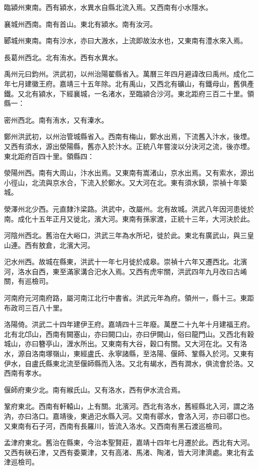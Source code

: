 臨潁州東南。西有潁水，水異水自縣北流入焉。又西南有小水隱水。

襄城州西南。南有首山。東北有潁水。南有汝河。

郾城州東南。南有沙水，亦曰大溵水，上流即故汝水也，又東南有澧水來入焉。

長葛州西北。北有洧水。西有水異水。

禹州元曰鈞州。洪武初，以州治陽翟縣省入。萬曆三年四月避諱改曰禹州。成化二年七月建徽王府。嘉靖三十五年除。北有禹山，又西北有礦山，有鐵母山，舊俱產鐵。又北有潁水，下經襄城，一名渚水，至臨潁合沙河。東北距府三百二十里。領縣一：

密州西北。南有洧水，又有溱水。

鄭州洪武初，以州治管城縣省入。西南有梅山，鄭水出焉，下流舊入汴水，後堙。又西有須水，源出滎陽縣，舊亦入於汴水。正統八年嘗浚以分決河之流，後亦堙。東北距府百四十里。領縣四：

滎陽州西。南有大周山，汴水出焉。又東南有嵩渚山，京水出焉。又有索水，源出小徑山，北流與京水合，下流入於鄭水。又大河在北。東有須水鎮，崇禎十年築城。

滎澤州北少西。元直隸汴梁路。洪武中，改屬州。北有故城。洪武八年因河患徙於南。成化十五年正月又徙北，濱大河。東南有孫家渡，正統十三年，大河決於此。

河陰州西北。舊治在大峪口，洪武三年為水所圮，徙於此。東北有廣武山，與三皇山連。西有敖倉，北濱大河。

汜水州西。故城在縣東，洪武十一年七月徙於成皋。崇禎十六年又遷西北。北濱河，洛水自西，東至滿家溝合汜水入焉。又西有虎牢關，洪武四年九月改曰古崤關，有巡檢司。

河南府元河南府路，屬河南江北行中書省。洪武元年為府。領州一，縣十三。東距布政司三百八十里。

洛陽倚。洪武二十四年建伊王府。嘉靖四十三年廢。萬歷二十九年十月建福王府。北有北邙山，西南有闕塞山，亦曰闕口山，亦曰伊闕山，俗曰龍門山。又西北有穀城山，亦曰簪亭山，湹水所出。又東南有大谷，穀口有關。又大河在北。又有洛水，源自洛南塚嶺山，東經盧氏、永寧諸縣，至洛陽、偃師、鞏縣入於河。又東有伊水，自盧氏縣東北流至偃師縣而入洛。又北有朅水，西有澗水，俱流會於洛。又西南有孝水。

偃師府東少北。南有緱氏山。又有洛水，西有伊水流合焉。

鞏府東北。西南有軒轅山，上有關。北濱河。西北有洛水，舊經縣北入河，謂之洛汭，亦曰洛口。嘉靖後，東過汜水縣入河。又南有鄩水，會洛入河，亦曰鄩口也。又東南有石子河，西南有長羅川，皆流入洛水。又西南有黑石渡巡檢司。

孟津府東北。舊治在縣東，今治本聖賢莊，嘉靖十四年七月遷於此。西北有大河。又西有硤石津，又西有委粟津，又有高渚、馬渚、陶渚，皆大河津濟處。東北有孟津巡檢司。

